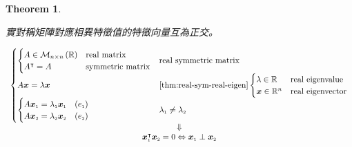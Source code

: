 \documentclass[
]{book}
\newtheorem{theorem}{Theorem}[chapter]
\theoremstyle{definition}
\theoremstyle{definition}
\theoremstyle{definition}
\theoremstyle{definition}
\theoremstyle{remark}
\begin{document}
\begin{theorem}
\protect\hypertarget{thm:unnamed-chunk-4}{}\label{thm:unnamed-chunk-4}\leavevmode

\begin{CJK}{UTF8}{bsmi}
實對稱矩陣對應相異特徵值的特徵向量互為正交。
\end{CJK}

\[
\begin{array}{c}
\begin{cases}
\begin{cases}
A\in\mathcal{M}_{n\times n}\left(\mathbb{R}\right) & \textup{real matrix}\\
A^{\intercal}=A & \textup{symmetric matrix}
\end{cases} & \textup{real symmetric matrix}\\
A\boldsymbol{x}=\lambda\boldsymbol{x} & \ref{thm:real-sym-real-eigen}\begin{cases}
\lambda\in\mathbb{R} & \textup{real eigenvalue}\\
\boldsymbol{x}\in\mathbb{R}^{n} & \textup{real eigenvector}
\end{cases}\\
\begin{cases}
A\boldsymbol{x}_{{\scriptscriptstyle 1}}=\lambda_{{\scriptscriptstyle 1}}\boldsymbol{x}_{{\scriptscriptstyle 1}} & \left(e_{{\scriptscriptstyle 1}}\right)\\
A\boldsymbol{x}_{{\scriptscriptstyle 2}}=\lambda_{{\scriptscriptstyle 2}}\boldsymbol{x}_{{\scriptscriptstyle 2}} & \left(e_{{\scriptscriptstyle 2}}\right)
\end{cases} & \lambda_{{\scriptscriptstyle 1}}\ne\lambda_{{\scriptscriptstyle 2}}
\end{cases}\\
\Downarrow\\
\boldsymbol{x}_{{\scriptscriptstyle 1}}^{\intercal}\boldsymbol{x}_{{\scriptscriptstyle 2}}=0\Leftrightarrow\boldsymbol{x}_{{\scriptscriptstyle 1}}\perp\boldsymbol{x}_{{\scriptscriptstyle 2}}
\end{array}
\]

\end{theorem}
\end{document}
